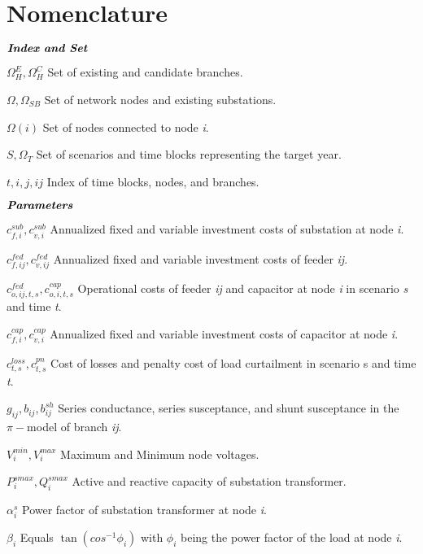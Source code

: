 \documentclass[journal]{IEEEtran}
\theoremstyle{remark}
\begin{document}
\section*{Nomenclature}
\begin{IEEEdescription}
\item[$\textbf{\textit{Index and Set}}$]
\item[$\Omega^{E}_{H},\Omega^{C}_{H}$] Set of existing and candidate branches.
\item[$\Omega,  \Omega_{SB}$] Set of network nodes and existing substations.
\item[$\Omega{(i)}$] Set of nodes connected to node \textit{i}.
\item[$S,\Omega_{T}$] Set of scenarios and time blocks representing the target year.
\item[$t,i,j,ij$] Index of time blocks, nodes, and branches.\\
\item[$\textbf{\textit{Parameters}}$]
\item[$c_{f,i}^{sub}, c_{v,i}^{sub}$] Annualized fixed and variable investment costs of substation at node \textit{i}.
\item[$ c_{f,ij}^{fed}, c_{v,ij}^{fed} $] Annualized fixed and variable investment costs of feeder \textit{ij}.
\item[$ c_{o,ij,t,s}^{fed}, c_{o,i,t,s}^{cap} $] Operational costs of feeder \textit{ij} and capacitor at node \textit{i} in scenario \textit{s} and time \textit{t}.
\item[$ c_{f,i}^{cap}, c_{v,i}^{cap}$] Annualized fixed and variable investment costs of capacitor at node \textit{i}.
\item[$ c_{t,s}^{loss}, c_{t,s}^{pn}$] Cost of losses and penalty cost of load curtailment in scenario s and time \textit{t}.
\item[$ g_{ij}, b_{ij},b_{ij}^{sh} $] Series conductance, series susceptance, and shunt susceptance in the \(\pi-\)model of branch \textit{ij}.
\item[$V_{i}^{min}, V_{i}^{max}$] Maximum and Minimum node voltages.
\item[$P_{i}^{smax}, Q_{i}^{smax}$] Active and reactive capacity of substation transformer.
\item[$\alpha_{i}^{s} $]Power factor of substation transformer at node \textit{i}.
\item[$\beta_{i} $] Equals $\tan{(cos^{-1}{\phi_i})}$ with $\phi_i$ being the power factor of the load at node \textit{i}.

\end{IEEEdescription}
\end{document}
